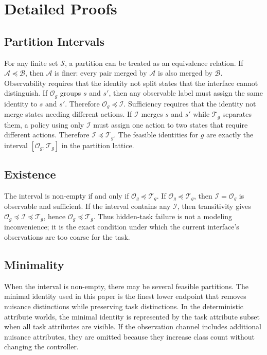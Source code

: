 \documentclass{article}
\newcommand{\states}{\mathcal{S}}
\newcommand{\obs}{\mathcal{O}}
\newcommand{\task}{\mathcal{T}}
\newcommand{\ident}{\mathcal{I}}
\begin{document}
\appendix

\section{Detailed Proofs}

\subsection{Partition Intervals}

For any finite set $\states$, a partition can be treated as an equivalence relation.
If $\mathcal{A}\preceq\mathcal{B}$, then $\mathcal{A}$ is finer: every pair merged by $\mathcal{A}$ is also merged by $\mathcal{B}$.
Observability requires that the identity not split states that the interface cannot distinguish.
If $\obs_g$ groups $s$ and $s'$, then any observable label must assign the same identity to $s$ and $s'$.
Therefore $\obs_g\preceq\ident$.
Sufficiency requires that the identity not merge states needing different actions.
If $\ident$ merges $s$ and $s'$ while $\task_g$ separates them, a policy using only $\ident$ must assign one action to two states that require different actions.
Therefore $\ident\preceq\task_g$.
The feasible identities for $g$ are exactly the interval $[\obs_g,\task_g]$ in the partition lattice.

\subsection{Existence}

The interval is non-empty if and only if $\obs_g\preceq\task_g$.
If $\obs_g\preceq\task_g$, then $\ident=\obs_g$ is observable and sufficient.
If the interval contains any $\ident$, then transitivity gives $\obs_g\preceq\ident\preceq\task_g$, hence $\obs_g\preceq\task_g$.
Thus hidden-task failure is not a modeling inconvenience; it is the exact condition under which the current interface's observations are too coarse for the task.

\subsection{Minimality}

When the interval is non-empty, there may be several feasible partitions.
The minimal identity used in this paper is the finest lower endpoint that removes nuisance distinctions while preserving task distinctions.
In the deterministic attribute worlds, the minimal identity is represented by the task attribute subset when all task attributes are visible.
If the observation channel includes additional nuisance attributes, they are omitted because they increase class count without changing the controller.
\end{document}
